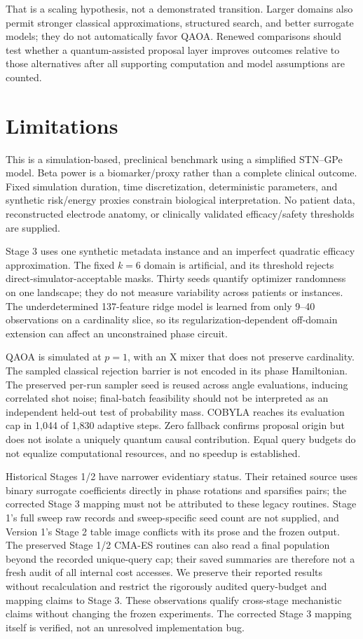 \documentclass[11pt,letterpaper]{article}
\begin{document}
That is a scaling hypothesis, not a demonstrated transition. Larger domains also permit stronger classical approximations, structured search, and better surrogate models; they do not automatically favor QAOA. Renewed comparisons should test whether a quantum-assisted proposal layer improves outcomes relative to those alternatives after all supporting computation and model assumptions are counted.

\section{Limitations}\label{sec:limits}
This is a simulation-based, preclinical benchmark using a simplified STN--GPe model. Beta power is a biomarker/proxy rather than a complete clinical outcome. Fixed simulation duration, time discretization, deterministic parameters, and synthetic risk/energy proxies constrain biological interpretation. No patient data, reconstructed electrode anatomy, or clinically validated efficacy/safety thresholds are supplied.

Stage 3 uses one synthetic metadata instance and an imperfect quadratic efficacy approximation. The fixed $k=6$ domain is artificial, and its threshold rejects direct-simulator-acceptable masks. Thirty seeds quantify optimizer randomness on one landscape; they do not measure variability across patients or instances. The underdetermined 137-feature ridge model is learned from only 9--40 observations on a cardinality slice, so its regularization-dependent off-domain extension can affect an unconstrained phase circuit.

QAOA is simulated at $p=1$, with an X mixer that does not preserve cardinality. The sampled classical rejection barrier is not encoded in its phase Hamiltonian. The preserved per-run sampler seed is reused across angle evaluations, inducing correlated shot noise; final-batch feasibility should not be interpreted as an independent held-out test of probability mass. COBYLA reaches its evaluation cap in 1,044 of 1,830 adaptive steps. Zero fallback confirms proposal origin but does not isolate a uniquely quantum causal contribution. Equal query budgets do not equalize computational resources, and no speedup is established.

Historical Stages 1/2 have narrower evidentiary status. Their retained source uses binary surrogate coefficients directly in phase rotations and sparsifies pairs; the corrected Stage 3 mapping must not be attributed to these legacy routines. Stage 1's full sweep raw records and sweep-specific seed count are not supplied, and Version 1's Stage 2 table image conflicts with its prose and the frozen output. The preserved Stage 1/2 CMA-ES routines can also read a final population beyond the recorded unique-query cap; their saved summaries are therefore not a fresh audit of all internal cost accesses. We preserve their reported results without recalculation and restrict the rigorously audited query-budget and mapping claims to Stage 3. These observations qualify cross-stage mechanistic claims without changing the frozen experiments. The corrected Stage 3 mapping itself is verified, not an unresolved implementation bug.
\end{document}
